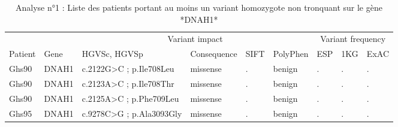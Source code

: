 \documentclass[12pt,twoside]{reedthesis}
\theoremstyle{definition}
\theoremstyle{definition}
\theoremstyle{remark}
\begin{document}
  \begin{landscape}
  \begin{longtable}[t]{lllllllll}
  \caption{\label{tab:tabdnah1moderate}Analyse n°1 : Liste des patients portant au moins un variant homozygote non tronquant sur le gène *DNAH1*}\\
  \toprule
  \multicolumn{1}{c}{ } & \multicolumn{1}{c}{ } & \multicolumn{4}{c}{Variant impact} & \multicolumn{3}{c}{Variant frequency} \\
  \cmidrule(l{2pt}r{2pt}){3-6} \cmidrule(l{2pt}r{2pt}){7-9}
  Patient & Gene & HGVSc, HGVSp & Consequence & SIFT & PolyPhen & ESP & 1KG & ExAC\\
  \midrule
  Ghs90 & DNAH1 & c.2122G>C ; p.Ile708Leu & missense & . & benign & . & . & .\\
  Ghs90 & DNAH1 & c.2123A>C ; p.Ile708Thr & missense & . & benign & . & . & .\\
  Ghs90 & DNAH1 & c.2125A>C ; p.Phe709Leu & missense & . & benign & . & . & .\\
  Ghs95 & DNAH1 & c.9278C>G ; p.Ala3093Gly & missense & . & benign & . & . & .\\
  \bottomrule
  \end{longtable}
  \end{landscape}
  
  \newpage
  
\end{document}
